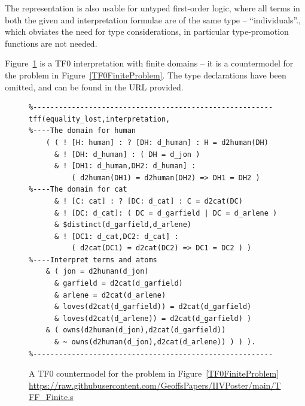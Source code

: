 \documentclass[letterpaper]{article}
\begin{document}
{%
The representation is also usable for untyped first-order logic, where all terms in both the 
given and interpretation formulae are of the same type -- ``individuals''., which obviates the 
need for type considerations, in particular type-promotion functions are not needed.
 
Figure~\ref{TF0FiniteInterpretation} is a TF0 interpretation with finite domains -- it is a 
countermodel for the problem in Figure~\ref{TF0FiniteProblem}.
The type declarations have been omitted, and can be found in the URL provided.

\begin{figure}[htbp]
\scriptsize
{}
\begin{verbatim}
%--------------------------------------------------------
tff(equality_lost,interpretation,
%----The domain for human
    ( ( ! [H: human] : ? [DH: d_human] : H = d2human(DH)
      & ! [DH: d_human] : ( DH = d_jon )
      & ! [DH1: d_human,DH2: d_human] :
          ( d2human(DH1) = d2human(DH2) => DH1 = DH2 )
%----The domain for cat
      & ! [C: cat] : ? [DC: d_cat] : C = d2cat(DC)
      & ! [DC: d_cat]: ( DC = d_garfield | DC = d_arlene )
      & $distinct(d_garfield,d_arlene)
      & ! [DC1: d_cat,DC2: d_cat] :
          ( d2cat(DC1) = d2cat(DC2) => DC1 = DC2 ) )
%----Interpret terms and atoms
    & ( jon = d2human(d_jon)
      & garfield = d2cat(d_garfield)
      & arlene = d2cat(d_arlene)
      & loves(d2cat(d_garfield)) = d2cat(d_garfield)
      & loves(d2cat(d_arlene)) = d2cat(d_garfield) )
    & ( owns(d2human(d_jon),d2cat(d_garfield))
      & ~ owns(d2human(d_jon),d2cat(d_arlene)) ) ) ).
%--------------------------------------------------------
\end{verbatim}
\caption{A TF0 countermodel for the problem in Figure~\ref{TF0FiniteProblem} \\
{\scriptsize \url{https://raw.githubusercontent.com/GeoffsPapers/IIVPoster/main/TFF_Finite.s}}}
\label{TF0FiniteInterpretation}
\end{figure}

}
\end{document}
